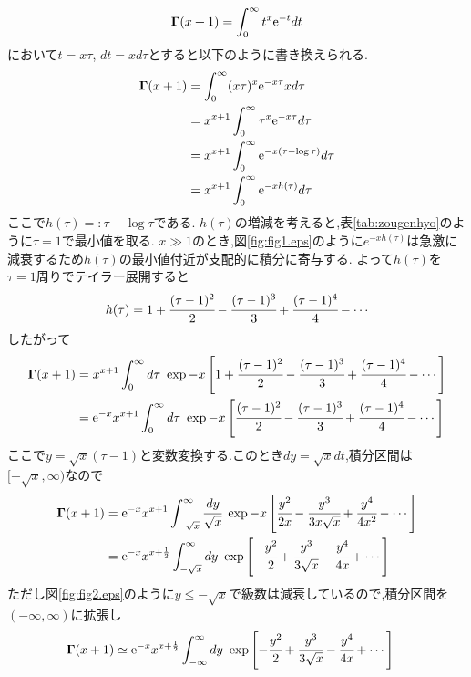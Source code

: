 \subsection{}
\begin{align}
  {\bf\Gamma}(x+1)=\int^{\infty}_0t^x{\rm e}^{-t}dt
\end{align}
において$t=x\tau$, $dt=xd\tau$とすると以下のように書き換えられる.
\begin{align}
  {\bf\Gamma}(x+1)&=\int^{\infty}_0(x\tau)^x{\rm e}^{-x\tau}xd\tau\\
  &=x^{x+1}\int^{\infty}_0\tau^x{\rm e}^{-x\tau}d\tau\\
  &=x^{x+1}\int^{\infty}_0{\rm e}^{-x(\tau-\log\tau)}d\tau\\
  &=x^{x+1}\int^{\infty}_0{\rm e}^{-xh(\tau)}d\tau
\end{align}
ここで$h(\tau)=:\tau-\log\tau$である. $h(\tau)$の増減を考えると,表\ref{tab:zougenhyo}のように$\tau=1$で最小値を取る.
$x\gg1$のとき,図\ref{fig:fig1.eps}のように$e^{-xh(\tau)}$は急激に減衰するため$h(\tau)$の最小値付近が支配的に積分に寄与する.
よって$h(\tau)$を$\tau=1$周りでテイラー展開すると
\begin{align}
  h(\tau)=1+\cfrac{(\tau-1)^2}{2}-\cfrac{(\tau-1)^3}{3}+\cfrac{(\tau-1)^4}{4}-\cdots
\end{align}
したがって
\begin{align}
  {\bf\Gamma}(x+1)&=x^{x+1}\int^{\infty}_0d\tau\ \exp-x\left[1+\cfrac{(\tau-1)^2}{2}-\cfrac{(\tau-1)^3}{3}+\cfrac{(\tau-1)^4}{4}-\cdots\right]\\
  &={\rm e}^{-x}x^{x+1}\int^{\infty}_0d\tau\ \exp-x\left[\cfrac{(\tau-1)^2}{2}-\cfrac{(\tau-1)^3}{3}+\cfrac{(\tau-1)^4}{4}-\cdots\right]
\end{align}
ここで$y=\sqrt{x}(\tau-1)$と変数変換する.このとき$dy=\sqrt{x}dt$,積分区間は$[-\sqrt{x},\infty)$なので
\begin{align}
  {\bf\Gamma}(x+1)&={\rm e}^{-x}x^{x+1}\int^{\infty}_{-\sqrt{x}}\cfrac{dy}{\sqrt{x}}\ \exp-x\left[\cfrac{y^2}{2x}-\cfrac{y^3}{3x\sqrt{x}}+\cfrac{y^4}{4x^2}-\cdots\right]\\
  &={\rm e}^{-x}x^{x+\frac{1}{2}}\int^{\infty}_{-\sqrt{x}}dy\ \exp\left[-\cfrac{y^2}{2}+\cfrac{y^3}{3\sqrt{x}}-\cfrac{y^4}{4x}+\cdots\right]
\end{align}
ただし図\ref{fig:fig2.eps}のように$y\leq-\sqrt{x}$で級数は減衰しているので,積分区間を$(-\infty,\infty)$に拡張し
\begin{align}
  \label{res_2_b}
  {\bf\Gamma}(x+1)&\simeq{\rm e}^{-x}x^{x+\frac{1}{2}}\int^{\infty}_{-\infty}dy\ \exp\left[-\cfrac{y^2}{2}+\cfrac{y^3}{3\sqrt{x}}-\cfrac{y^4}{4x}+\cdots\right]
\end{align}

